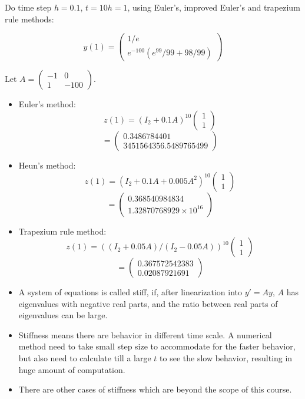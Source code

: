 \documentclass[20pt]{article} %
\theoremstyle{break}
\begin{document}
Do time step $h=0.1$, $t=10h=1$, using Euler's, improved Euler's and trapezium rule methods:

\[y(1)=\left(\begin{array}{c}1/e\\e^{-100}(e^{99}/99+98/99)\end{array}\right)\]

Let $A=\left(\begin{array}{cc} -1 & 0 \\ 1 & -100\end{array}\right)$.\\

\begin{itemize}
\item Euler's method: 
\[z(1)=(I_2+0.1A)^{10}\left(\begin{array}{c}1\\1\end{array}\right)\]
\[=\left(\begin{array}{c}0.3486784401\\ 3451564356.5489765499 \end{array}\right)\]

\newpage

\item Heun's method:
\[z(1)=(I_2+0.1A+0.005A^2)^{10}\left(\begin{array}{c}1\\1\end{array}\right)\]
\[=\left(\begin{array}{c}0.368540984834\\ 1.32870768929\times 10^{16} \end{array}\right)\]

\item Trapezium rule method:
\[z(1)=((I_2+0.05A)/(I_2-0.05A))^{10}\left(\begin{array}{c}1\\1\end{array}\right)\]
\[=\left(\begin{array}{c}0.367572542383\\ 0.02087921691 \end{array}\right)\]

\end{itemize}



\newpage

\begin{itemize}
\item A system of equations is called stiff, if, after linearization into $y'=Ay$, $A$ has eigenvalues with negative real parts, and the ratio between real parts of eigenvalues can be large.
\item Stiffness means there are behavior in different time scale. A numerical method need to take small step size to accommodate for the faster behavior, but also need to calculate till a large $t$ to see the slow behavior, resulting in huge amount of computation.
\item There are other cases of stiffness which are beyond the scope of this course.
\end{itemize}
\end{document}
